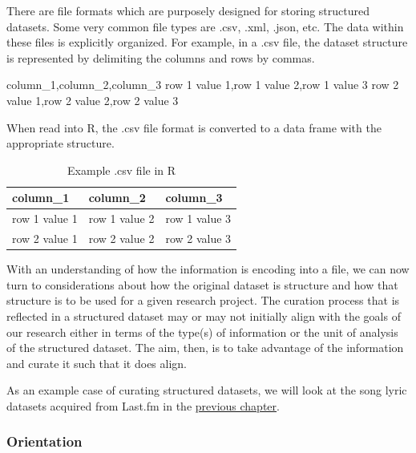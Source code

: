 \documentclass[
]{article}
\newenvironment{Shaded}{\begin{snugshade}}{\end{snugshade}}
\newcommand{\NormalTok}[1]{#1}
\begin{document}
There are file formats which are purposely designed for storing structured datasets. Some very common file types are .csv, .xml, .json, etc. The data within these files is explicitly organized. For example, in a .csv file, the dataset structure is represented by delimiting the columns and rows by commas.

\begin{Shaded}
\begin{Highlighting}[]
\NormalTok{column\_1,column\_2,column\_3}
\NormalTok{row 1 value 1,row 1 value 2,row 1 value 3}
\NormalTok{row 2 value 1,row 2 value 2,row 2 value 3}
\end{Highlighting}
\end{Shaded}

When read into R, the .csv file format is converted to a data frame with the appropriate structure.

\begin{table}

\caption{\label{tab:cd-structured-example-table-csv}Example .csv file in R}
\centering
\begin{tabular}[t]{lll}
\toprule
column\_1 & column\_2 & column\_3\\
\midrule
row 1 value 1 & row 1 value 2 & row 1 value 3\\
row 2 value 1 & row 2 value 2 & row 2 value 3\\
\bottomrule
\end{tabular}
\end{table}

With an understanding of how the information is encoding into a file, we can now turn to considerations about how the original dataset is structure and how that structure is to be used for a given research project. The curation process that is reflected in a structured dataset may or may not initially align with the goals of our research either in terms of the type(s) of information or the unit of analysis of the structured dataset. The aim, then, is to take advantage of the information and curate it such that it does align.

As an example case of curating structured datasets, we will look at the song lyric datasets acquired from Last.fm in the \protect\hyperlink{acquire-data}{previous chapter}.

\hypertarget{orientation-1}{%
\subsubsection{Orientation}\label{orientation-1}}
\end{document}
